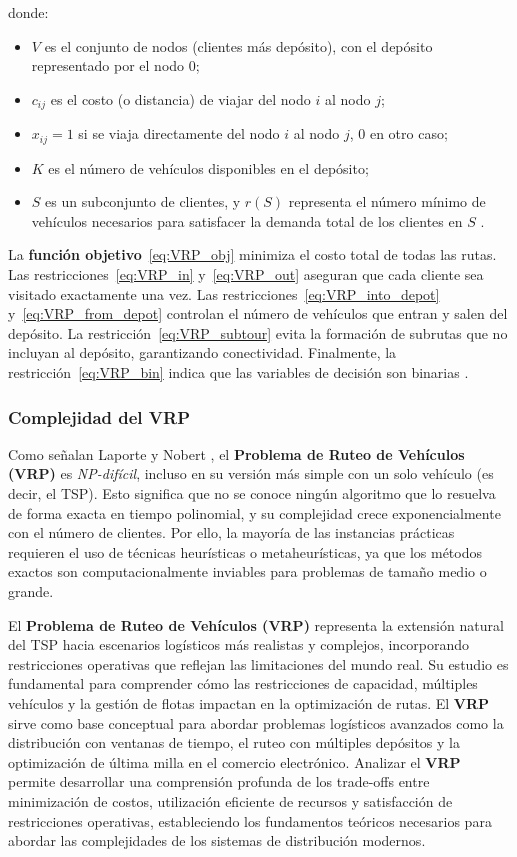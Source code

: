 \documentclass[12pt,titlepage,twoside,openright]{book}
\begin{document}
\noindent donde:
\begin{itemize}
	\item \(V\) es el conjunto de nodos (clientes más depósito), con el depósito representado por el nodo 0;
	\item \(c_{ij}\) es el costo (o distancia) de viajar del nodo \(i\) al nodo \(j\);
	\item \(x_{ij} = 1\) si se viaja directamente del nodo \(i\) al nodo \(j\), 0 en otro caso;
	\item \(K\) es el número de vehículos disponibles en el depósito;
	\item \(S\) es un subconjunto de clientes, y \(r(S)\) representa el número mínimo de vehículos necesarios para satisfacer la demanda total de los clientes en \(S\) \citep{toth2014}.
\end{itemize}

La \textbf{función objetivo}~\eqref{eq:VRP_obj} minimiza el costo total de todas las rutas. Las restricciones~\eqref{eq:VRP_in} y~\eqref{eq:VRP_out} aseguran que cada cliente sea visitado exactamente una vez. Las restricciones~\eqref{eq:VRP_into_depot} y~\eqref{eq:VRP_from_depot} controlan el número de vehículos que entran y salen del depósito. La restricción~\eqref{eq:VRP_subtour} evita la formación de subrutas que no incluyan al depósito, garantizando conectividad. Finalmente, la restricción~\eqref{eq:VRP_bin} indica que las variables de decisión son binarias \citep{toth2014}.


\subsubsection*{Complejidad del VRP}
\label{subsec:complejidad_vrp}

Como señalan Laporte y Nobert \cite{laporte1987}, el \textbf{Problema de Ruteo de Vehículos (VRP)} es \textit{NP-difícil}, incluso en su versión más simple con un solo vehículo (es decir, el TSP). Esto significa que no se conoce ningún algoritmo que lo resuelva de forma exacta en tiempo polinomial, y su complejidad crece exponencialmente con el número de clientes. Por ello, la mayoría de las instancias prácticas requieren el uso de técnicas heurísticas o metaheurísticas, ya que los métodos exactos son computacionalmente inviables para problemas de tamaño medio o grande.

El \textbf{Problema de Ruteo de Vehículos (VRP)} representa la extensión natural del TSP hacia escenarios logísticos más realistas y complejos, incorporando restricciones operativas que reflejan las limitaciones del mundo real. Su estudio es fundamental para comprender cómo las restricciones de capacidad, múltiples vehículos y la gestión de flotas impactan en la optimización de rutas. El \textbf{VRP} sirve como base conceptual para abordar problemas logísticos avanzados como la distribución con ventanas de tiempo, el ruteo con múltiples depósitos y la optimización de última milla en el comercio electrónico. Analizar el \textbf{VRP} permite desarrollar una comprensión profunda de los trade-offs entre minimización de costos, utilización eficiente de recursos y satisfacción de restricciones operativas, estableciendo los fundamentos teóricos necesarios para abordar las complejidades de los sistemas de distribución modernos.
\end{document}
